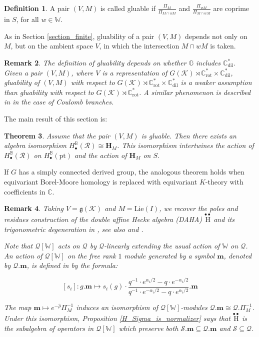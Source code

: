 \documentclass[11pt]{article}
\newcommand{\C}{\mathbb{C}}
\newcommand{\K}{\mathcal{K}}
\renewcommand{\S}{\mathcal{S}}
\newcommand{\R}{\mathcal{R}}
\renewcommand{\H}{\textbf{H}}
\newcommand{\g}{\mathfrak{g}}
\newcommand{\bbG}{\mathbb{G}}
\newcommand{\bbB}{\mathbb{B}}
\newcommand{\1}{\mathbb{1}}
\newcommand{\tW}{\mathbb{W}}
\newcommand{\HBM}[2]{H_\bullet^{#1}(#2)}
\newcommand{\Crot}{\C^*_{\text{rot}}}
\newcommand{\Cdil}{\C^*_{\text{dil}}}
\newcommand{\pt}{\text{pt}}
\newcommand{\ddH}{\overset{\bullet\bullet}{\mathrm{H}}}
\renewcommand{\subset}{\subseteq}
\newtheorem{theorem}{Theorem}[section]
\newtheorem{remark}[theorem]{Remark}
\theoremstyle{definition}
\newtheorem{definition}[theorem]{Definition}
\numberwithin{equation}{section}
\begin{document}
\begin{definition}
\label{affine_def_gluable}
    A pair $(V,M)$ is called gluable if $\frac{\Pi_{M}}{\Pi_{M\cap wM}}$ and $\frac{\Pi_{wM}}{\Pi_{M\cap wM}}$ are coprime in $S$, for all $w\in \tW$.
\end{definition}

As in Section \ref{section_finite}, gluability of a pair $(V,M)$ depends not only on $M$, but on the ambient space $V$, in which the intersection $M\cap wM$ is taken.

\begin{remark}
    The definition of gluability depends on whether $\bbG$ includes $\Cdil$. Given a pair $(V,M)$, where $V$ is a representation of $G(\K) \rtimes \Crot \times \Cdil$, gluability of $(V,M)$ with respect to $G(\K) \rtimes \Crot \times \Cdil$ is a weaker assumption than gluability with respect to $G(\K) \rtimes \Crot$. A similar phenomenon is described in \cite[Corollaries 2.9, 2.10]{GW} in the case of Coulomb branches.
\end{remark}

The main result of this section is:

\begin{theorem}
    \label{affine_H(R)=H_M}
     Assume that the pair $(V,M)$ is gluable. Then there exists an algebra isomorphism $\HBM{\bbB}{\R} \cong \H_M$. This isomorphism intertwines the action of $\HBM{\bbB}{\R}$ on $\HBM{\bbB}{\pt}$ and the action of $\H_M$ on $S$.
\end{theorem}

If $G$ has a simply connected derived group, the analogous theorem holds when equivariant Borel-Moore homology is replaced with equivariant $K$-theory with coefficients in $\C$.

\begin{remark}
\label{affine_DAHA_remark}
Taking $V = \g(\K)$ and $M = \text{Lie}(I)$, we recover the poles and residues construction of the double affine Hecke algebra (DAHA) $\ddH$ and its trigonometric degeneration in \cite[Theorem 6.3.1]{GKV}, see also \cite{VV} and \cite[Theorem 6.1]{GKO}.

Note that $\mathcal{Q}[\tW]$ acts on $\mathcal{Q}$ by $\mathcal{Q}$-linearly extending the usual action of $\tW$ on $\mathcal{Q}$. An action of $\mathcal{Q}[\tW]$ on the free rank $1$ module generated by a symbol $\mathbf{m}$, denoted by $\mathcal{Q}.\mathbf{m}$, is defined in \cite[(7.7)]{BEG} by the formula:

$$[s_i] : g . \mathbf{m} \mapsto s_i(g) \cdot \frac{{q}^{-1} \cdot e^{\alpha_i/2} - {q} \cdot e^{-\alpha_i/2}}{{q}^{-1} \cdot e^{-\alpha_i/2} - {q} \cdot e^{\alpha_i/2}} . \mathbf{m}$$

The map $\mathbf{m}\mapsto e^{-\hat{\rho}} \varPi_M^{-1}$ induces an isomorphism of $\mathcal{Q}[\tW]$-modules $\mathcal{Q}.\mathbf{m} \cong \mathcal{Q}.\varPi_M^{-1}$. Under this isomorphism, Proposition \ref{H_Sigma_is_normalizer} says that $\ddH$ is the subalgebra of operators in $\mathcal{Q}[\tW]$ which preserve both $\S.\mathbf{m} \subset \mathcal{Q}.\mathbf{m}$ and $\S\subset \mathcal{Q}$.    
\end{remark}
\end{document}
